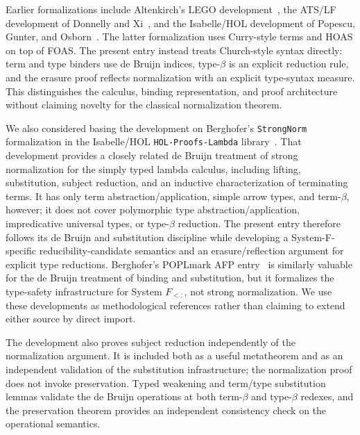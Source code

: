 \documentclass[11pt,a4paper]{article}
\begin{document}
Earlier formalizations include Altenkirch's LEGO development~\cite{Altenkirch1993},
the ATS/LF development of Donnelly and Xi~\cite{DonnellyXi2007}, and the
Isabelle/HOL development of Popescu, Gunter, and Osborn~\cite{Popescu2010}.
The latter formalization uses Curry-style terms and HOAS on top of FOAS.  The
present entry instead treats Church-style syntax directly: term and type
binders use de Bruijn indices, type-\(\beta\) is an explicit reduction rule,
and the erasure proof reflects normalization with an explicit type-syntax
measure.  This distinguishes the calculus, binding representation, and proof
architecture without claiming novelty for the classical normalization theorem.

We also considered basing the development on Berghofer's
\texttt{StrongNorm} formalization in the Isabelle/HOL
\texttt{HOL-Proofs-Lambda} library~\cite{BerghoferStrongNorm}.  That
development provides a closely related de Bruijn treatment of strong
normalization for the simply typed
lambda calculus, including lifting, substitution, subject reduction, and an
inductive characterization of terminating terms.  It has only term
abstraction/application, simple arrow types, and term-\(\beta\), however; it
does not cover polymorphic type abstraction/application, impredicative
universal types, or type-\(\beta\) reduction.  The present entry therefore
follows its de Bruijn and substitution discipline while developing a
System-F-specific reducibility-candidate semantics and an erasure/reflection
argument for explicit type reductions.  Berghofer's POPLmark AFP
entry~\cite{BerghoferPOPLmark2007} is similarly valuable for the de Bruijn
treatment of binding and substitution,
but it formalizes the type-safety infrastructure for System \(F_{<:}\), not
strong normalization.  We use these developments as methodological
references rather than claiming to extend either source by direct import.

The development also proves subject reduction independently of the
normalization argument.  It is included both as a useful metatheorem and as
an independent validation of the substitution infrastructure; the
normalization proof does not invoke preservation.  Typed weakening and
term/type substitution lemmas validate the de Bruijn operations at both
term-\(\beta\) and type-\(\beta\) redexes, and the preservation theorem provides
an independent consistency check on the operational semantics.





\end{document}
